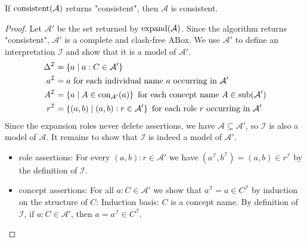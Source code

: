 \begin{lemma}[Soundness]\label{lem:4.5}
	If $\operatorname{\text{consistent}}(\mathcal{A})$ returns "consistent", then $\mathcal{A}$ is consistent.
\end{lemma}
\begin{proof}
	Let $\mathcal{A}'$ be the set returned by $\operatorname{\text{expand}}(\mathcal{A})$.
	Since the algorithm returns "consistent", $\mathcal{A}'$ is a complete and clash-free ABox.
	We use $\mathcal{A}'$ to define an interpretation $\mathcal{I}$ and show that it is a model of $\mathcal{A}'$.
	\begin{align*}
		\Delta^\mathcal{I} &= \left\{ a \mid a:C \in \mathcal{A}' \right\}\\
		a^\mathcal{I} &= a \text{ for each individual name $a$ occurring in $\mathcal{A}'$} \\
		A^\mathcal{I} &= \left\{ a \mid A \in \operatorname{\text{con}}_{\mathcal{A}'}(a) \right\} \text{ for each concept name } A \in \operatorname{\text{sub}}(\mathcal{A'}) \\
		r^\mathcal{I} &= \left\{ (a,b) \mid (a,b):r \in \mathcal{A}' \right\} \text{ for each role $r$ occurring in $\mathcal{A}'$}
	\end{align*}
	Since the expansion roles never delete assertions, we have $\mathcal{A} \subseteq \mathcal{A}'$, so $\mathcal{I}$ is also a model of $\mathcal{A}$.
	It remains to show that $\mathcal{I}$ is indeed a model of $\mathcal{A}'$.
	\begin{itemize}
		\item role assertions: For every $(a,b) : r \in \mathcal{A}'$ we have $(a^\mathcal{I},b^\mathcal{I}) = (a,b) \in r^\mathcal{I}$ by the definition of $\mathcal{I}$.
		\item concept assertions: For all $a : C \in \mathcal{A}'$ we show that $a^\mathcal{I} = a \in C^\mathcal{I}$ by induction on the structure of $C$:
			Induction basis: $C$ is a concept name.
			By definition of $\mathcal{I}$, if $a : C \in \mathcal{A}'$, then $a = a^\mathcal{I} \in C^\mathcal{I}$.


\end{itemize}
\end{proof}
